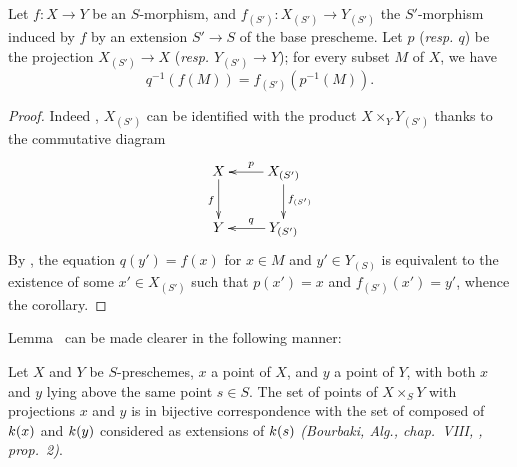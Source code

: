 \begin{corollary}[3.4.8]
\label{I.3.4.8}
Let $f:X\to Y$ be an $S$-morphism, and $f_{(S')}:X_{(S')}\to Y_{(S')}$ the $S'$-morphism induced by $f$ by an extension $S'\to S$ of the base prescheme.
Let $p$ (\emph{resp. $q$}) be the projection $X_{(S')}\to X$ (\emph{resp. $Y_{(S')}\to Y$}); for every subset $M$ of $X$, we have
\[
  q^{-1}(f(M))=f_{(S')}(p^{-1}(M)).
\]
\end{corollary}

\begin{proof}
\label{proof-I.3.4.8}
Indeed , $X_{(S')}$ can be identified with the product $X\times_Y Y_{(S')}$ thanks to the commutative diagram
\[
  \xymatrix{
    X\ar[d]_f &
    X_{(S')}\ar[l]_p\ar[d]^{f_{(S')}}\\
    Y &
    Y_{(S')}\ar[l]_q
  }
\]
By , the equation $q(y')=f(x)$ for $x\in M$ and $y'\in Y_{(S)}$ is equivalent to the existence of some $x'\in X_{(S')}$ such that $p(x')=x$ and $f_{(S')}(x')=y'$, whence the corollary.
\end{proof}

Lemma~ can be made clearer in the following manner:
\begin{proposition}[3.4.9]
\label{I.3.4.9}
Let $X$ and $Y$ be $S$-preschemes, $x$ a point of $X$, and $y$ a point of $Y$, with both $x$ and $y$ lying above the same point $s\in S$.
The set of points of $X\times_S Y$ with projections $x$ and $y$ is in bijective correspondence with the set of  composed of $k(x)$ and $k(y)$ considered as extensions of $k(s)$ \emph{(Bourbaki, \emph{Alg.}, chap.~VIII, , prop.~2)}.
\end{proposition}

